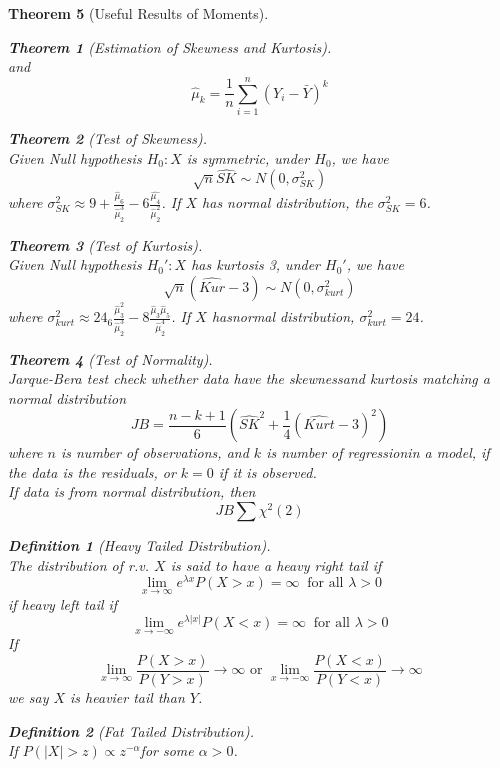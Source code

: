 \documentclass[12pt]{article}
\newtheorem{definition}{Definition}[section]
\newtheorem{theorem}{Theorem}[section]
\theoremstyle{definition}
\begin{document}
\begin{theorem}[Useful Results of Moments]
\begin{theorem}[Estimation of Skewness and Kurtosis]
\[\]
and
\[
\hat{\mu}_k= \frac{1}{n}\sum_{i=1}^n(Y_i-\bar{Y})^k
\]
\end{theorem}
\begin{theorem}[Test of Skewness]
\hfill\\\normalfont Given Null hypothesis $H_0: X$ is symmetric, under $H_0$, we have
\[
\sqrt{n}\hat{SK}\sim N(0,\sigma_{SK}^2)
\]
where $\sigma_{SK}^2\approx 9 + \frac{\hat{\mu}_6}{\hat{\mu}_2^3}-6\frac{\hat{\mu_4}}{\hat{\mu}_2^2}$.
If $X$ has normal distribution, the $\sigma_{SK}^2 = 6$.
\end{theorem}
\begin{theorem}[Test of Kurtosis]
\hfill\\\normalfont Given Null hypothesis $H_0': X$ has kurtosis 3, under $H_0'$, we have
\[
\sqrt{n}(\hat{Kur}-3)\sim N(0, \sigma_{kurt}^2)
\]
where $\sigma_{kurt}^2 \approx 24 _ 6\frac{\hat{\mu}_3^2}{\hat{\mu}_2^3} - 8\frac{\hat{\mu}_3\hat{\mu}_5}{\hat{\mu}_2^4}$.
If $X$ hasnormal distribution, $\sigma_{kurt}^2= 24$.
\end{theorem}
\begin{theorem}[Test of Normality]
\hfill\\\normalfont Jarque-Bera test check whether data have the skewnessand kurtosis matching a normal distribution
\[
JB=\frac{n-k+1}{6}(\hat{SK}^2+\frac{1}{4}(\hat{Kurt}-3)^2)
\]
where $n$ is number of observations, and $k$ is number of regressionin a model, if the data is the residuals, or $k = 0$ if it is observed.\\
If data is from normal distribution, then 
\[
JB\sum\chi^2(2)
\]
\end{theorem}
\begin{definition}[Heavy Tailed Distribution]
\hfill\\\normalfont The distribution of r.v. $X$ is said to have a heavy right tail if
\[
\lim_{x\to\infty}e^{\lambda x}P(X>x)=\infty \;\;\text{for all }\lambda>0
\]
if heavy left tail if
\[
\lim_{x\to-\infty}e^{\lambda|x|}P(X<x)=\infty \;\;\text{for all }\lambda>0
\]
If
\[
\lim_{x\to\infty}\frac{P(X>x)}{P(Y>x)}\to\infty\text{ or }\lim_{x\to-\infty}\frac{P(X<x)}{P(Y<x)}\to\infty
\]
we say $X$ is heavier tail than $Y$.
\end{definition}
\begin{definition}[Fat Tailed Distribution]
\hfill\\\normalfont If $P(|X|>z)\propto z^{-\alpha}$for some $\alpha>0$.
\end{definition}


\end{theorem}
\end{document}
